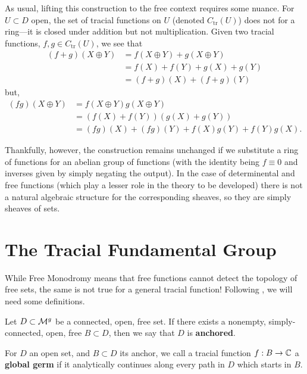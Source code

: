 As usual, lifting this construction to the free context requires some nuance.
For \(U \subset D\) open, the set of tracial functions on \(U\) (denoted
\(C_{\text{tr}}(U)\)) does not for a ring---it is closed under addition but not
multiplication. Given two tracial functions, \(f,g \in C_{\text{tr}}(U)\), we see
that
\begin{align*}
  (f+g)(X \oplus Y) &= f(X \oplus Y) + g(X \oplus Y) \\
                    &= f(X) + f(Y)+g(X) + g(Y) \\
                    &= (f+g) (X) + (f+g)(Y)
\end{align*}
but,
\begin{align*}
  (fg)(X \oplus Y) &= f(X \oplus Y)g(X \oplus Y) \\
                   &= (f(X) + f(Y))(g(X) + g(Y)) \\
                   &= (fg) (X) + (fg)(Y) + f(X)g(Y)+f(Y)g(X).
\end{align*}

Thankfully, however, the construction remains unchanged if we substitute a ring
of functions for an abelian group of functions (with the identity being
\(f \equiv 0\) and inverses given by simply negating the output). In the case of
determinental and free functions (which play a lesser role in the theory to be
developed) there is not a natural algebraic structure for the corresponding
sheaves, so they are simply sheaves of sets.

\section{The Tracial Fundamental Group}%
\label{sec:trpi1}

While Free Monodromy means that free functions cannot detect the topology of
free sets, the same is not true for a general tracial
function! Following \cite{pascoeFreeNoncommutativePrincipal2020}, we will need
some definitions.

\begin{definition}[Anchored]%
  \label{def:anchored}
Let \(D \subset \mathcal{M}^{g} \) be a connected, open, free set. If there exists a
nonempty, simply-connected, open, free \(B \subset D\), then we say that \(D\)
is \textbf{anchored}.
\end{definition}

\begin{definition}
  \label{def:globgerm}
  For \(D\) an open set, and \(B \subset D\) its anchor, we call a tracial
  function \(f:B\to \mathbb{C} \) a \textbf{global germ} if it analytically continues
  along every path in \(D\) which starts in \(B\).
\end{definition}


